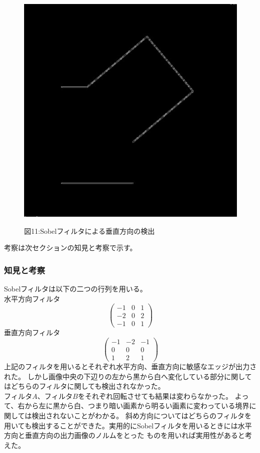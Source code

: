 ﻿\documentclass[a4j,11pt]{jarticle}
\begin{document}
\begin{figure}[tb]
\begin{minipage}{0.49\hsize}
   \includegraphics[width=0.7\hsize]{./eps/edge-sobely.eps}

   図11:Sobelフィルタによる垂直方向の検出
 \end{minipage}
 \label{fig:affine2}
\end{figure}
考察は次セクションの知見と考察で示す。
\subsubsection{知見と考察}
Sobelフィルタは以下の二つの行列を用いる。\\

水平方向フィルタ
$$
\begin{pmatrix}
  -1 & 0 & 1 \\
  -2 & 0 & 2 \\
  -1 & 0 & 1 
\end{pmatrix}
$$
垂直方向フィルタ
$$
\begin{pmatrix}
  -1 & -2 & -1 \\
   0 &  0 & 0 \\
   1 &  2 & 1 
\end{pmatrix}
$$
上記のフィルタを用いるとそれぞれ水平方向、垂直方向に敏感なエッジが出力された。
しかし画像中央の下辺りの左から黒から白へ変化している部分に関してはどちらのフィルタに関しても検出されなかった。
\(フィルタA、フィルタBをそれぞれ回転させても結果は変わらなかった。\)
よって、右から左に黒から白、つまり暗い画素から明るい画素に変わっている境界に関しては検出されないことがわかる。
斜め方向についてはどちらのフィルタを用いても検出することができた。実用的にSobelフィルタを用いるときには水平方向と垂直方向の出力画像のノルムをとった
ものを用いれば実用性があると考えた。
\end{document}
